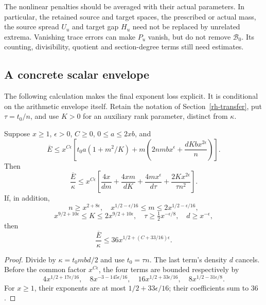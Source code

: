The nonlinear penalties should be averaged with their actual
parameters. In particular, the retained source and target spaces,
the prescribed or actual mass, the source spread $U_u$ and target gap $H_u$ need not
be replaced by unrelated extrema. Vanishing trace errors can make
$P_u$ vanish, but do not remove $\mathcal B_0$. Its counting,
divisibility, quotient and section-degree terms still need estimates.

\subsection{A concrete scalar envelope}

The following calculation makes the final exponent loss explicit.
It is conditional on the arithmetic envelope itself. Retain the
notation of Section~\ref{rh-transfer}, put $\tau=t_0/n$, and use
$K>0$ for an auxiliary rank parameter, distinct from $\kappa$.

\begin{proposition}\label{rh-four-terms}
Suppose $x\ge1$, $\epsilon>0$, $C\ge0$, $0\le a\le2xb$, and
\[
 \overline E\le x^{C\epsilon}
 \left[t_0a(1+m^2/K)
       +m\left(2nmbx^\epsilon+\frac{dKbx^{2\epsilon}}n\right)\right].
\]
Then
\begin{equation}\label{rh-four-terms-bound}
 \frac{\overline E}{\kappa}\le x^{C\epsilon}
 \left[\frac{4x}{dm}+\frac{4xm}{dK}
       +\frac{4mx^\epsilon}{d\tau}
       +\frac{2Kx^{2\epsilon}}{\tau n^2}\right].
\end{equation}
If, in addition,
\[
 n\ge x^{2+8\epsilon},\quad
 x^{1/2-\epsilon/16}\le m\le2x^{1/2-\epsilon/16},
\]
\[
 x^{9/2+10\epsilon}\le K\le2x^{9/2+10\epsilon},\quad
 \tau\ge\tfrac12x^{-\epsilon/8},\quad d\ge x^{-\epsilon},
\]
then
\begin{equation}\label{rh-thirty-six}
              \frac{\overline E}{\kappa}
                   \le36x^{1/2+(C+33/16)\epsilon}.
\end{equation}
\end{proposition}

\begin{proof}
Divide by $\kappa=t_0mbd/2$ and use $t_0=\tau n$.
The last term's density $d$ cancels. Before the common factor
$x^{C\epsilon}$, the four terms are bounded respectively by
\[
 4x^{1/2+17\epsilon/16},\quad
 8x^{-3-145\epsilon/16},\quad
 16x^{1/2+33\epsilon/16},\quad
 8x^{1/2-31\epsilon/8}.
\]
For $x\ge1$, their exponents are at most $1/2+33\epsilon/16$;
their coefficients sum to $36$.
\end{proof}

